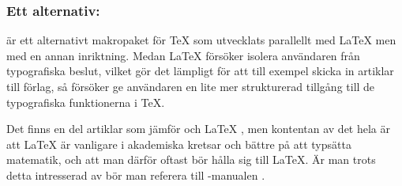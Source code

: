 \documentclass[lang=sv,ptsize=10pt,font=none,nomath,titles=bf,../../a4.tex]{subfiles}
\begin{document}
\subsubsection{Ett alternativ: }
 är ett alternativt makropaket för \TeX{} som utvecklats
parallellt med \LaTeX{} men med en annan inriktning. Medan \LaTeX{}
försöker isolera användaren från typografiska beslut, vilket gör det
lämpligt för att till exempel skicka in artiklar till förlag, så
försöker  ge användaren en lite mer strukturerad tillgång
till de typografiska funktionerna i \TeX.

Det finns en del artiklar som jämför  och \LaTeX{}
, men kontentan av det hela är att
\LaTeX{} är vanligare i akademiska kretsar och bättre på att typsätta
matematik, och att man därför oftast bör hålla sig till \LaTeX. Är man
trots detta intresserad av  bör man referera till
-manualen \cite{Hagen01}.

\end{document}
